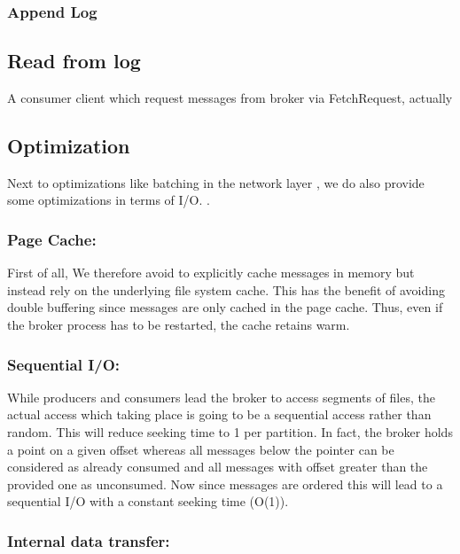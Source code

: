 \subsubsection{Append Log}


\subsection{Read from log}
A consumer client which request messages from broker via FetchRequest, actually

\subsection{Optimization}

Next to optimizations like batching in the network layer ,
we do also provide some optimizations in terms of I/O. .

\subsubsection{Page Cache:}

First of all, We therefore avoid to explicitly cache messages in memory but
instead rely on the underlying file system cache. This has the benefit of
avoiding double buffering since messages are only cached in the page cache.
Thus, even if the broker process has to be restarted, the cache retains warm.


\subsubsection{Sequential I/O: }

While producers and consumers lead the broker to access
segments of files, the actual access which taking place is going to be a
sequential access rather than random. This will reduce seeking time to 1 per
partition. In fact, the broker holds a point on a given offset whereas all
messages below the pointer can be considered as already consumed and all
messages with offset greater than the provided one as unconsumed. Now since
messages are ordered this will lead to a sequential I/O with a constant seeking
time (O(1)).


\subsubsection{Internal data transfer:}

